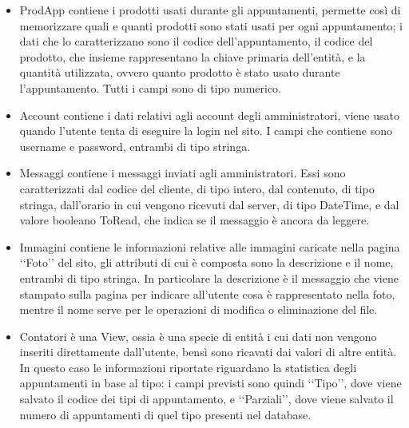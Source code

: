 {{\begin{itemize}
		\item ProdApp contiene i prodotti usati durante gli appuntamenti, permette così di memorizzare quali e quanti prodotti sono stati usati per ogni appuntamento; i dati che lo caratterizzano sono il codice dell'appuntamento, il codice del prodotto, che insieme rappresentano la chiave primaria dell'entità, e la quantità utilizzata, ovvero quanto prodotto è stato usato durante l'appuntamento. Tutti i campi sono di tipo numerico.
		\item Account contiene i dati relativi agli account degli amministratori, viene usato quando l'utente tenta di eseguire la login nel sito. I campi che contiene sono username e password, entrambi di tipo stringa.
		\item Messaggi contiene i messaggi inviati agli amministratori. Essi sono caratterizzati dal codice del cliente, di tipo intero, dal contenuto, di tipo stringa, dall'orario in cui vengono ricevuti dal server, di tipo DateTime, e dal valore booleano ToRead, che indica se il messaggio è ancora da leggere.
		\item Immagini contiene le informazioni relative alle immagini caricate nella pagina ‘‘Foto’’ del sito, gli attributi di cui è composta sono la descrizione e il nome, entrambi di tipo stringa. In particolare la descrizione è il messaggio che viene stampato sulla pagina per indicare all'utente cosa è rappresentato nella foto, mentre il nome serve per le operazioni di modifica o eliminazione del file.
		\item Contatori è una View, ossia è una specie di entità i cui dati non vengono inseriti direttamente dall'utente, bensì sono ricavati dai valori di altre entità. In questo caso le informazioni riportate riguardano la statistica degli appuntamenti in base al tipo: i campi previsti sono quindi ‘‘Tipo’’, dove viene salvato il codice dei tipi di appuntamento, e ‘‘Parziali’’, dove viene salvato il numero di appuntamenti di quel tipo presenti nel database.
		\end{itemize}
	}
}
